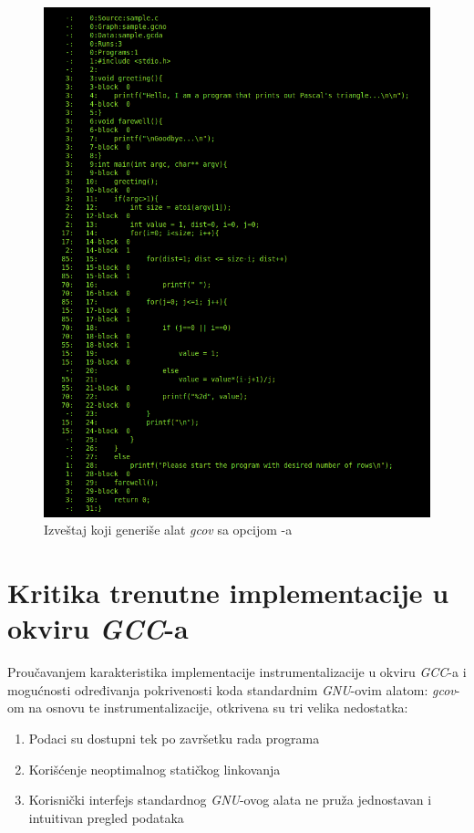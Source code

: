 \documentclass[12pt,oneside]{memoir}
\newcommand{\strano}[1]{\textit{#1}}
\begin{document}
\begin{figure}[!ht]
  \centering
  \includegraphics[width=\textwidth]{img/report_block.png}
  \caption{Izveštaj koji generiše alat        \strano{gcov} sa opcijom -a}
  \label{fig:report2}
\end{figure}

\section{Kritika trenutne implementacije u okviru \strano{GCC}-a }


Proučavanjem karakteristika implementacije instrumentalizacije u okviru \strano{GCC}-a i mogućnosti određivanja pokrivenosti koda standardnim \strano{GNU}-ovim alatom: \strano{gcov}-om na osnovu te instrumentalizacije, otkrivena su tri velika nedostatka:

\begin{enumerate}
\item Podaci su dostupni tek po završetku rada programa
\item Korišćenje neoptimalnog statičkog linkovanja
\item Korisnički interfejs standardnog \strano{GNU}-ovog alata ne pruža jednostavan i intuitivan pregled podataka
\end{enumerate}
\end{document}
